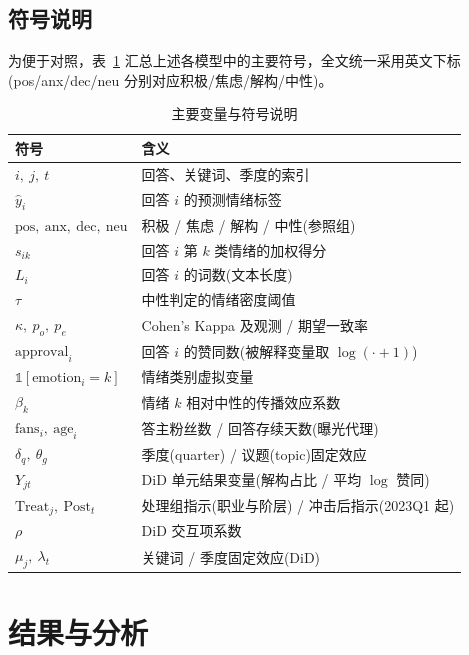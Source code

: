 \documentclass[11pt,a4paper]{ctexart}
\begin{document}
\subsection{符号说明}
为便于对照，表~\ref{tab:notation} 汇总上述各模型中的主要符号，全文统一采用英文下标(\textrm{pos}/\textrm{anx}/\textrm{dec}/\textrm{neu} 分别对应积极/焦虑/解构/中性)。

\begin{table}[H]
  \centering
  \small
  \caption{主要变量与符号说明}
  \label{tab:notation}
  \begin{tabular}{ll}
    \toprule
    符号 & 含义 \\
    \midrule
    $i,\ j,\ t$ & 回答、关键词、季度的索引 \\
    $\hat{y}_i$ & 回答 $i$ 的预测情绪标签 \\
    $\mathrm{pos},\ \mathrm{anx},\ \mathrm{dec},\ \mathrm{neu}$ & 积极 / 焦虑 / 解构 / 中性(参照组) \\
    $s_{ik}$ & 回答 $i$ 第 $k$ 类情绪的加权得分 \\
    $L_i$ & 回答 $i$ 的词数(文本长度) \\
    $\tau$ & 中性判定的情绪密度阈值 \\
    $\kappa,\ p_o,\ p_e$ & Cohen's Kappa 及观测 / 期望一致率 \\
    $\mathrm{approval}_i$ & 回答 $i$ 的赞同数(被解释变量取 $\log(\cdot+1)$) \\
    $\mathbb{1}[\mathrm{emotion}_i=k]$ & 情绪类别虚拟变量 \\
    $\beta_k$ & 情绪 $k$ 相对中性的传播效应系数 \\
    $\mathrm{fans}_i,\ \mathrm{age}_i$ & 答主粉丝数 / 回答存续天数(曝光代理) \\
    $\delta_q,\ \theta_g$ & 季度(quarter) / 议题(topic)固定效应 \\
    $Y_{jt}$ & DiD 单元结果变量(解构占比 / 平均 $\log$ 赞同) \\
    $\mathrm{Treat}_j,\ \mathrm{Post}_t$ & 处理组指示(职业与阶层) / 冲击后指示(2023Q1 起) \\
    $\rho$ & DiD 交互项系数 \\
    $\mu_j,\ \lambda_t$ & 关键词 / 季度固定效应(DiD) \\
    \bottomrule
  \end{tabular}
\end{table}

\section{结果与分析}
\end{document}
